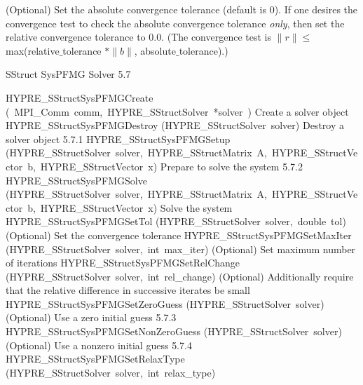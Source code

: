\documentclass{article}
\begin{document}
\begin{cxxentry}
\begin{cxxentry}
\begin{cxxfunction}
\begin{cxxdoc}
(Optional) Set the absolute convergence tolerance (default is 0). 
If one desires
the convergence test to check the absolute convergence tolerance {\it only}, then
set the relative convergence tolerance to 0.0.  (The convergence test is 
$\|r\| \leq$ max(relative$\_$tolerance $\ast \|b\|$, absolute$\_$tolerance).)

\end{cxxdoc}
\end{cxxfunction}
\end{cxxentry}
\begin{cxxentry}
{}
        {SStruct SysPFMG Solver}
        {}
        {
}
        {5.7}
\begin{cxxnames}
        {HYPRE\_SStructSysPFMGCreate}
        {(\ MPI\_Comm\ comm,\ HYPRE\_SStructSolver\ *solver\ )}
        {
Create a solver object}
        {}
\label{cxx.5.7.7}
        {HYPRE\_SStructSysPFMGDestroy}
        {(HYPRE\_SStructSolver\ solver)}
        {
Destroy a solver object}
        {5.7.1}
        {HYPRE\_SStructSysPFMGSetup}
        {(HYPRE\_SStructSolver\ solver,\ HYPRE\_SStructMatrix\ A,\ HYPRE\_SStructVector\ b,\ HYPRE\_SStructVector\ x)}
        {
Prepare to solve the system}
        {5.7.2}
        {HYPRE\_SStructSysPFMGSolve}
        {(HYPRE\_SStructSolver\ solver,\ HYPRE\_SStructMatrix\ A,\ HYPRE\_SStructVector\ b,\ HYPRE\_SStructVector\ x)}
        {
Solve the system}
        {}
\label{cxx.5.7.8}
        {HYPRE\_SStructSysPFMGSetTol}
        {(HYPRE\_SStructSolver\ solver,\ double\ tol)}
        {
(Optional) Set the convergence tolerance}
        {}
\label{cxx.5.7.9}
        {HYPRE\_SStructSysPFMGSetMaxIter}
        {(HYPRE\_SStructSolver\ solver,\ int\ max\_iter)}
        {
(Optional) Set maximum number of iterations}
        {}
\label{cxx.5.7.10}
        {HYPRE\_SStructSysPFMGSetRelChange}
        {(HYPRE\_SStructSolver\ solver,\ int\ rel\_change)}
        {
(Optional) Additionally require that the relative difference in
successive iterates be small}
        {}
\label{cxx.5.7.11}
        {HYPRE\_SStructSysPFMGSetZeroGuess}
        {(HYPRE\_SStructSolver\ solver)}
        {
(Optional) Use a zero initial guess}
        {5.7.3}
        {HYPRE\_SStructSysPFMGSetNonZeroGuess}
        {(HYPRE\_SStructSolver\ solver)}
        {
(Optional) Use a nonzero initial guess}
        {5.7.4}
        {HYPRE\_SStructSysPFMGSetRelaxType}
        {(HYPRE\_SStructSolver\ solver,\ int\ relax\_type)}
        {
}
\end{cxxnames}
\end{cxxentry}
\end{cxxentry}
\end{document}
